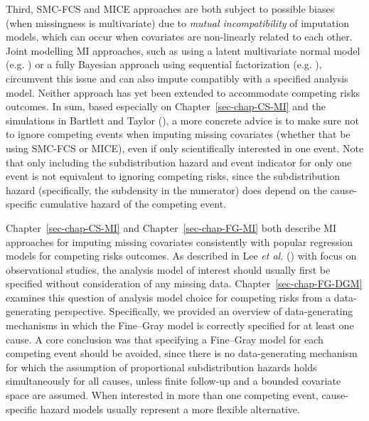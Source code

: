 \documentclass[
  letterpaper,
  paper=240mm:170mm,
  twoside=true,
  open=right,
  fontsize=10pt,
  pagesize=false,
  BCOR=15mm,
  DIV=14,
  headinclude=true,
  footinclude=false,
  headsepline=on]{scrbook}
\begin{document}
Third, SMC-FCS and MICE approaches are both subject to possible biases
(when missingness is multivariate) due to \emph{mutual incompatibility}
of imputation models, which can occur when covariates are non-linearly
related to each other. Joint modelling MI approaches, such as using a
latent multivariate normal model (e.g.
) or a fully Bayesian approach using sequential
factorization (e.g.
), circumvent this issue and can also impute compatibly with a
specified analysis model. Neither approach has yet been extended to
accommodate competing risks outcomes. In sum, based especially on
Chapter~\ref{sec-chap-CS-MI} and the simulations in Bartlett and Taylor
(), a more
concrete advice is to make sure not to ignore competing events when
imputing missing covariates (whether that be using SMC-FCS or MICE),
even if only scientifically interested in one event. Note that only
including the subdistribution hazard and event indicator for only one
event is not equivalent to ignoring competing risks, since the
subdistribution hazard (specifically, the subdensity in the numerator)
does depend on the cause-specific cumulative hazard of the competing
event.

Chapter~\ref{sec-chap-CS-MI} and Chapter~\ref{sec-chap-FG-MI} both
describe MI approaches for imputing missing covariates consistently with
popular regression models for competing risks outcomes. As described in
Lee \emph{et al.}
() with focus on
observational studies, the analysis model of interest should usually
first be specified without consideration of any missing data.
Chapter~\ref{sec-chap-FG-DGM} examines this question of analysis model
choice for competing risks from a data-generating perspective.
Specifically, we provided an overview of data-generating mechanisms in
which the Fine--Gray model is correctly specified for at least one
cause. A core conclusion was that specifying a Fine--Gray model for each
competing event should be avoided, since there is no data-generating
mechanism for which the assumption of proportional subdistribution
hazards holds simultaneously for all causes, unless finite follow-up and
a bounded covariate space are assumed. When interested in more than one
competing event, cause-specific hazard models usually represent a more
flexible alternative.
\end{document}
